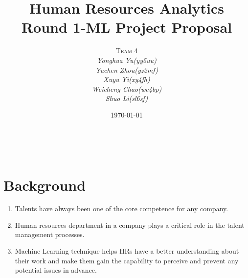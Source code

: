 \documentclass[a4paper, 11pt]{article} %
\title{\textbf{Human Resources Analytics}\\
\Large Round 1-ML Project Proposal} %
\author{\textsc{Team 4} %
\\{\textit{Yonghua Yu(yy5uu)}}
\\{\textit{Yuchen Zhou(yz2mf)}}
\\{\textit{Xuyu Yi(xy4fh)}}
\\{\textit{Weicheng Chao(wc4bp)}}
\\{\textit{Shuo Li(sl6sf)}}
} %
\date{\today} %
\makeatletter
\renewcommand{\maketitle}{ %
\begin{flushright} %
{\LARGE\@title} %


\vspace{20pt} %

{\large\@author} %
\\\@date %

\vspace{40pt} %
\end{flushright}

}
\makeatother
\begin{document}
\maketitle %







\section*{Background}
\begin{enumerate}
\item Talents have always been one of the core competence for any company.
\item Human resources department in a company plays a critical role in the talent management processes.
\item Machine Learning technique helps HRs have a better understanding about their work and make them gain the capability to perceive and prevent any potential issues in advance.

\end{enumerate}
\end{document}
